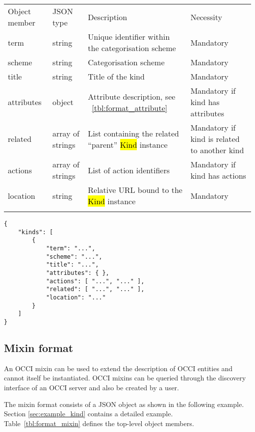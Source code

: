 \documentclass[10pt,a4paper]{article}
\begin{document}
 {
    \begin{tabular}{llll}
    \toprule
    Object member & JSON type & Description & Necessity\\
    \colrule
    term & string & Unique identifier within the categorisation scheme & Mandatory\\
    scheme & string & Categorisation scheme & Mandatory\\
    title & string & Title of the kind & Mandatory\\
    attributes & object & Attribute description, see ~\ref{tbl:format_attribute} & Mandatory if kind has attributes\\
    related & array of strings & List containing the related ``parent'' \hl{Kind} instance & Mandatory if kind is related to another kind\\
    actions & array of strings & List of action identifiers & Mandatory if kind has actions\\
    location & string & Relative URL bound to the \hl{Kind} instance & Mandatory\\
    \botrule
    \end{tabular}
}

\begin{verbatim}
{
    "kinds": [
        {
            "term": "...",
            "scheme": "...",
            "title": "...",
            "attributes": { },
            "actions": [ "...", "..." ],
            "related": [ "...", "..." ],
            "location": "..."
        }
    ]
}
\end{verbatim}

\subsection{Mixin format}
\label{sec:format_mixin}

An OCCI mixin can be used to extend the description of OCCI entities and cannot itself be 
instantiated. OCCI mixins can be queried through the discovery interface 
of an OCCI server and also be created by a user.

The mixin format consists of a JSON object as shown in the
following example. Section \ref{sec:example_kind} contains a detailed example.
Table~\ref{tbl:format_mixin} defines the top-level object members.
\end{document}
